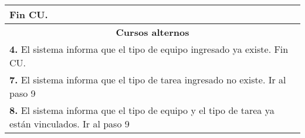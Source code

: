 \documentclass[12pt]{extarticle}
\begin{document}
\begin{longtable}{ |p{8cm}|p{8cm}| }


			\inc Fin CU. & \\
		\hline
		\multicolumn{2}{|c|}{\textbf{Cursos alternos}}\\
		\hline
		\multicolumn{2}{|p{16cm}|}{\textbf{4. }El sistema informa que el tipo de equipo ingresado ya existe. Fin CU.}\\
		\hline
		\multicolumn{2}{|p{16cm}|}{\textbf{7. }El sistema informa que el tipo de tarea ingresado no existe. Ir al paso 9}\\
		\hline	
		\multicolumn{2}{|p{16cm}|}{\textbf{8. }El sistema informa que el tipo de equipo y el tipo de tarea ya están vinculados. Ir al paso 9}\\
		\hline	
	\end{longtable}

    \resetinc{}
    \raya{}
\end{document}

